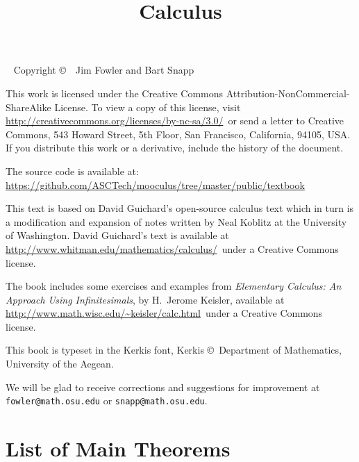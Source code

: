 \documentclass[justified,openany,nofonts]{tufte-book}
\title{Calculus}
\begin{document}
\maketitle



\begin{fullwidth}
~\vfill
\thispagestyle{empty}
\setlength{\parindent}{0pt}
\setlength{\parskip}{\baselineskip}
Copyright \copyright\ \the\year\ Jim Fowler and Bart Snapp

This work is licensed under the Creative Commons
Attribution-NonCommercial-ShareAlike License. To view a copy of this
license, visit
\url{http://creativecommons.org/licenses/by-nc-sa/3.0/}~or send a
letter to Creative Commons, 543 Howard Street, 5th Floor, San
Francisco, California, 94105, USA. If you distribute this work or a
derivative, include the history of the document. 

The source code is available
at: \url{https://github.com/ASCTech/mooculus/tree/master/public/textbook}

\noindent
This text is based on David Guichard's open-source calculus text which
in turn is a modification and expansion of notes written by Neal
Koblitz at the University of Washington. David Guichard's text is
available at \url{http://www.whitman.edu/mathematics/calculus/}~under a Creative Commons license.

\noindent The book includes some exercises and examples from {\it
  Elementary Calculus: An Approach Using Infinitesimals}, by H.~Jerome
Keisler, available at
\url{http://www.math.wisc.edu/~keisler/calc.html}~under a Creative
Commons license. 


\noindent This book is typeset in the Kerkis font, 
Kerkis \copyright~Department of Mathematics, University of the Aegean.


\noindent We will be glad to receive corrections and suggestions for
improvement at \texttt{fowler@math.osu.edu} or
\texttt{snapp@math.osu.edu}.

\end{fullwidth}


\tableofcontents





\chapter*{List of Main Theorems}%
\end{document}
